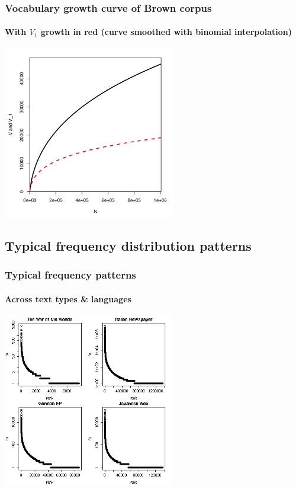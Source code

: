 \documentclass[handout,notes=show,t]{beamer} %
\begin{document}
\begin{frame}
  \frametitle{Vocabulary growth curve of Brown corpus}
  \framesubtitle{With $V_1$ growth in red (curve smoothed with binomial interpolation)}

  \ungap
  \begin{center}
    \includegraphics[height=7.5cm]{img/brown-vgc}
  \end{center}
\end{frame}

\subsection{Typical frequency distribution patterns}

\begin{frame}
  \frametitle{Typical frequency patterns} 
  \framesubtitle{Across text types \& languages}

  \ungap[1.5]
  \begin{center}
    \includegraphics[height=7.5cm]{img/othercorporarf}
  \end{center}
\end{frame}
\end{document}
